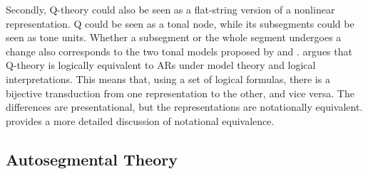 Secondly, Q-theory could also be seen as a flat-string version of a nonlinear
representation. Q could be seen as a tonal node, while its subsegments could be
seen as tone units. Whether a subsegment or the whole segment undergoes a change
also corresponds to the two tonal models proposed by \citet{yip1980}
 and
\citet{bao1999structure}. \citet{jardine2021qtheory} argues that Q-theory is
logically equivalent to ARs under model theory and logical interpretations. This
means that, using a set of logical formulas, there is a bijective transduction
from one representation to the other, and vice versa. The differences are
presentational, but the representations are notationally equivalent.
\citet{oakdenNotationalEquivalenceTonal2020} provides a more detailed discussion
of notational equivalence.






\subsection{Autosegmental Theory}


